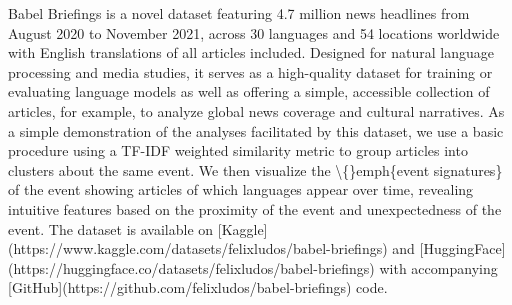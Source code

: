 Babel Briefings is a novel dataset featuring 4.7 million news headlines from August 2020 to November 2021, across 30 languages and 54 locations worldwide with English translations of all articles included. Designed for natural language processing and media studies, it serves as a high-quality dataset for training or evaluating language models as well as offering a simple, accessible collection of articles, for example, to analyze global news coverage and cultural narratives. As a simple demonstration of the analyses facilitated by this dataset, we use a basic procedure using a TF-IDF weighted similarity metric to group articles into clusters about the same event. We then visualize the \textbackslash\{\}emph\{event signatures\} of the event showing articles of which languages appear over time, revealing intuitive features based on the proximity of the event and unexpectedness of the event. The dataset is available on [Kaggle](https://www.kaggle.com/datasets/felixludos/babel-briefings) and [HuggingFace](https://huggingface.co/datasets/felixludos/babel-briefings) with accompanying [GitHub](https://github.com/felixludos/babel-briefings) code.